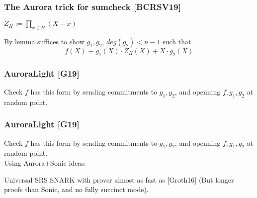 \documentclass[shadesubsections,trans,14pt,mathserif]{beamer}
\newcommand{\defeq}{\ensuremath{:=}}
\begin{document}
  \begin{frame}
\frametitle{The Aurora trick for sumcheck \small{[BCRSV19]}}
$Z_H \defeq \prod_{x\in H}(X-x)$
 \vspace{0.4in}

By lemma suffices to show $g_1,g_2$, $deg(g_2)<n-1$ such that
 \[ f(X)\equiv g_1(X)\cdot Z_H(X) +X\cdot g_2(X) \]
\end{frame}


  \begin{frame}
\frametitle{AuroraLight \small{[G19]}}
Check $f$ has this form by sending commitments to $g_1,g_2$,
and openning $f,g_1,g_2$ at random point.\\
 \vspace{0.4in}
% 
\end{frame}

  \begin{frame}
\frametitle{AuroraLight \small{[G19]}}
Check $f$ has this form by sending commitments to $g_1,g_2$,
and openning $f,g_1,g_2$ at random point.\\
 \vspace{0.4in}
Using Aurora+Sonic ideas:
\begin{corollary}
 Universal SRS SNARK with prover almost as fast as {\small{[Groth16]}}
 (But longer proofs than Sonic, and no fully succinct mode).
\end{corollary}

\end{frame}
\end{document}
